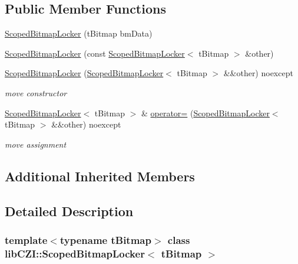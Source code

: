 \subsection*{Public Member Functions}
\begin{DoxyCompactItemize}
\item 
\hyperlink{classlib_c_z_i_1_1_scoped_bitmap_locker_a871926718a1b6f2b00002d327154049b}{Scoped\+Bitmap\+Locker} (t\+Bitmap bm\+Data)
\item 
\hyperlink{classlib_c_z_i_1_1_scoped_bitmap_locker_a3d5e197884453daaa5c6252a6dd19e9e}{Scoped\+Bitmap\+Locker} (const \hyperlink{classlib_c_z_i_1_1_scoped_bitmap_locker}{Scoped\+Bitmap\+Locker}$<$ t\+Bitmap $>$ \&other)
\item 
\mbox{\label{classlib_c_z_i_1_1_scoped_bitmap_locker_ae8096865753018bffff4544c28ab4945}} 
\hyperlink{classlib_c_z_i_1_1_scoped_bitmap_locker_ae8096865753018bffff4544c28ab4945}{Scoped\+Bitmap\+Locker} (\hyperlink{classlib_c_z_i_1_1_scoped_bitmap_locker}{Scoped\+Bitmap\+Locker}$<$ t\+Bitmap $>$ \&\&other) noexcept
\begin{DoxyCompactList}\small\item\em move constructor \end{DoxyCompactList}\item 
\mbox{\label{classlib_c_z_i_1_1_scoped_bitmap_locker_aaaf38bc85de0190783597ccf3620fd85}} 
\hyperlink{classlib_c_z_i_1_1_scoped_bitmap_locker}{Scoped\+Bitmap\+Locker}$<$ t\+Bitmap $>$ \& \hyperlink{classlib_c_z_i_1_1_scoped_bitmap_locker_aaaf38bc85de0190783597ccf3620fd85}{operator=} (\hyperlink{classlib_c_z_i_1_1_scoped_bitmap_locker}{Scoped\+Bitmap\+Locker}$<$ t\+Bitmap $>$ \&\&other) noexcept
\begin{DoxyCompactList}\small\item\em move assignment \end{DoxyCompactList}\end{DoxyCompactItemize}
\subsection*{Additional Inherited Members}


\subsection{Detailed Description}
\subsubsection*{template$<$typename t\+Bitmap$>$\newline
class lib\+C\+Z\+I\+::\+Scoped\+Bitmap\+Locker$<$ t\+Bitmap $>$}

